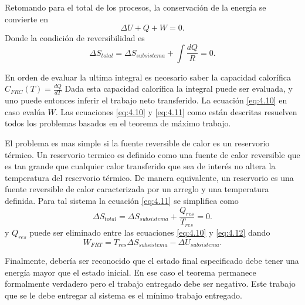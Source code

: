 \documentclass{report}
\begin{document}
Retomando para el total de los procesos, la conservación de la energía se convierte en
\begin{equation}
  \label{eq:4.10}
  \Delta U + Q + W = 0
.\end{equation}
Donde la condición de reversibilidad es
\begin{equation}
  \label{eq:4.11}
  \Delta S_{total} = \Delta S_{subsistema}
  + \int \frac{dQ}{R}=0
.\end{equation}

En orden de evaluar la ultima integral es necesario saber la capacidad calorífica $C_{FRC}(T)=\frac{dQ}{dT}$ Dada esta capacidad calorífica la integral puede ser evaluada, y uno puede entonces inferir el trabajo neto transferido. La ecuación \ref{eq:4.10} en caso evalúa $W$. Las ecuaciones \ref{eq:4.10} y \ref{eq:4.11} como están descritas resuelven todos los problemas basados en el teorema de máximo trabajo.

El problema es mas simple si la fuente reversible de calor es un reservorio térmico. Un reservorio termico es definido como una fuente de calor reversible que es tan grande que cualquier calor transferido que sea de interés no altera la temperatura del reservorio térmico. De manera equivalente, un reservorio es una fuente reversible de calor caracterizada por un arreglo y una temperatura definida. Para tal sistema la ecuación \ref{eq:4.11} se simplifica como
\begin{equation}
  \label{eq:4.12}
  \Delta S_{total} = \Delta S_{subsistema} + \frac{Q_{res}}{T_{res}}=0
.\end{equation}
y $Q_{res}$ puede ser eliminado entre las ecuaciones \ref{eq:4.10} y \ref{eq:4.12} dando
\begin{equation}
  \label{eq:4.13}
  W_{FRT} = T_{res}\Delta S_{subsistema}-\Delta U_{subsistema}
.\end{equation}

Finalmente, debería ser reconocido que el estado final especificado debe tener una energía mayor que el estado inicial. En ese caso el teorema permanece formalmente verdadero pero el trabajo entregado debe ser negativo. Este trabajo que se le debe entregar al sistema es el mínimo trabajo entregado.
\end{document}
